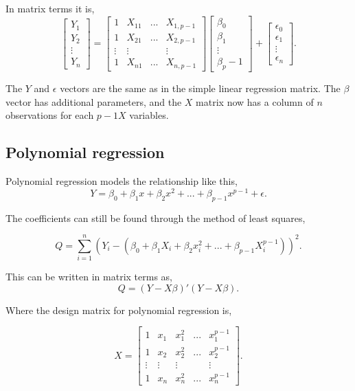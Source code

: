 \noindent In matrix terms it is,  
$$
\left[
\begin{array}{c}
	Y_1 \\ 
	Y_2 \\ 
	\vdots \\
	Y_n 
\end{array}
\right]
=
\left[
\begin{array}{cccc}
	1 & X_{11} & ... & X_{1, p-1} \\ 
	1 & X_{21} & ... & X_{2, p-1} \\ 
	\vdots & \vdots &  & \vdots \\
	1 & X_{n1} & ... & X_{n, p-1}
\end{array}
\right]
\left[
\begin{array}{c}
	\beta_0 \\ 
	\beta_1 \\
	\vdots \\
	\beta_p-1 
\end{array}
\right]
+
\left[
\begin{array}{c}
	\epsilon_0 \\ 
	\epsilon_1 \\
	\vdots \\
	\epsilon_n 
\end{array}
\right].
$$

\noindent The $Y$ and $\epsilon$ vectors are the same as in the simple linear regression matrix. The $\beta$ vector has additional parameters, and the $X$ matrix now has a column of $n$ observations for each $p-1 X$ variables. 

\subsection{Polynomial regression}
Polynomial regression models the relationship like this, 
$$Y=\beta_0 + \beta_1 x + \beta_2 x^2	+ ... + \beta_{p-1} x^{p-1}+ \epsilon .$$

\noindent The coefficients can still be found through the method of least squares,

$$Q=\sum_{i=1}^{n}(Y_i -(\beta_0 + \beta_1 X_i + \beta_2 x_i^2 + ... + \beta_{p-1}X_{i}^{p-1}))^2 .$$
\newline

\noindent This can be written in matrix terms as,
$$Q=(Y-X\beta)' (Y-X\beta) .$$

\noindent Where the design matrix for polynomial regression is, 

$$ X=
\left[
\begin{array}{ccccc}
	1&x_1&x_1^2&...&x_1^{p-1}\\ 
	1&x_2&x_2^2&...&x_2^{p-1} \\
	\vdots & \vdots &\vdots &&\vdots\\
	1&x_n&x_n^2&...&x_n^{p-1} 
\end{array}
\right].
$$

